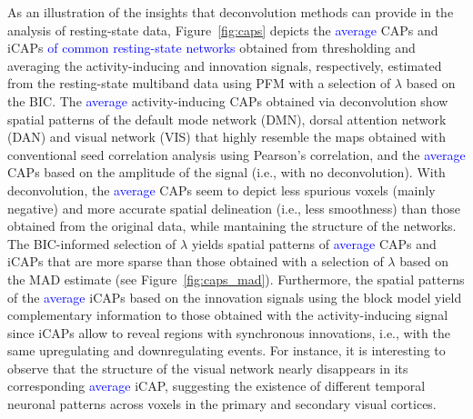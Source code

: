 As an illustration of the insights that deconvolution methods can provide in the
analysis of resting-state data, Figure~\ref{fig:caps} depicts the
\textcolor{blue}{average} CAPs and iCAPs \textcolor{blue}{of common
resting-state networks} obtained from thresholding and averaging the
activity-inducing and innovation signals, respectively, estimated from the
resting-state multiband data using PFM with a selection of $\lambda$ based on
the BIC. The \textcolor{blue}{average} activity-inducing CAPs obtained via
deconvolution show spatial patterns of the default mode network (DMN), dorsal
attention network (DAN) and visual network (VIS) that highly resemble the maps
obtained with conventional seed correlation analysis using Pearson's
correlation, and the \textcolor{blue}{average} CAPs based on the amplitude of
the signal (i.e., with no deconvolution). With deconvolution, the
\textcolor{blue}{average} CAPs seem to depict less spurious voxels (mainly
negative) and more accurate spatial delineation (i.e., less smoothness) than
those obtained from the original data, while mantaining the structure of the
networks. The BIC-informed selection of $\lambda$ yields spatial patterns of
\textcolor{blue}{average} CAPs and iCAPs that are more sparse than those
obtained with a selection of $\lambda$ based on the MAD estimate (see
Figure~\ref{fig:caps_mad}). Furthermore, the spatial patterns of the
\textcolor{blue}{average} iCAPs based on the innovation signals using the block
model yield complementary information to those obtained with the
activity-inducing signal since iCAPs allow to reveal regions with synchronous
innovations, i.e., with the same upregulating and downregulating events. For
instance, it is interesting to observe that the structure of the visual network
nearly disappears in its corresponding \textcolor{blue}{average} iCAP,
suggesting the existence of different temporal neuronal patterns across voxels
in the primary and secondary visual cortices. 

